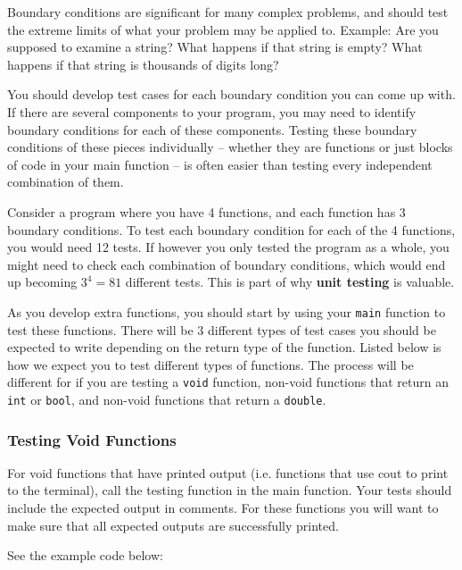 Boundary conditions are significant for many complex problems, and should test the extreme limits of what your problem may be applied to. Example: Are you supposed to examine a string? What happens if that string is empty? What happens if that string is thousands of digits long? 

You should develop test cases for each boundary condition you can come up with. If there are several components to your program, you may need to identify boundary conditions for each of these components. Testing these boundary conditions of these pieces individually -- whether they are functions or just blocks of code in your main function -- is often easier than testing every independent combination of them. 

Consider a program where you have 4 functions, and each function has 3 boundary conditions. To test each boundary condition for each of the 4 functions, you would need 12 tests. If however you only tested the program as a whole, you might need to check each combination of boundary conditions, which would end up becoming $3^4 = 81$ different tests. This is part of why \textbf{unit testing} is valuable. 

As you develop extra functions, you should start by using your \texttt{main} function to test these functions. There will be 3 different types of test cases you should be expected to write depending on the return type of the function. Listed below is how we expect you to test different types of functions. The process will be different for if you are testing a \texttt{void} function, non-void functions that return an \texttt{int} or \texttt{bool}, and non-void functions that return a \texttt{double}.

\subsubsection{Testing Void Functions}

For void functions that have printed output (i.e. functions that use cout to print to the terminal), call the testing function in the main function. Your tests should include the expected output in comments. For these functions you will want to make sure that all expected outputs are successfully printed.

See the example code below:

